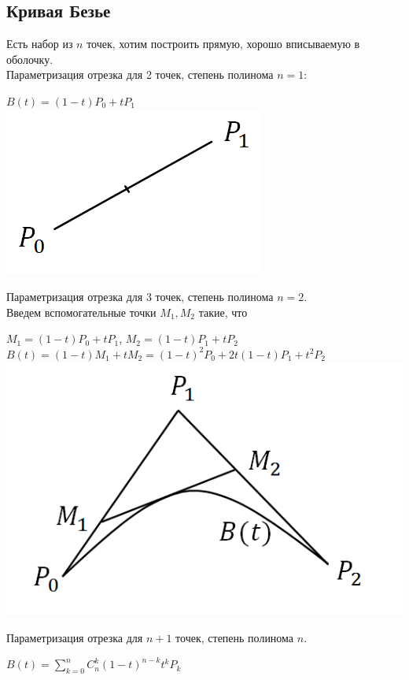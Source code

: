 \documentclass[12pt]{article}
\begin{document}
	\subsection{Кривая Безье}
	Есть набор из $n$ точек, хотим построить прямую, хорошо вписываемую в оболочку.\\
	Параметризация отрезка для 2 точек, степень полинома $n = 1$:
	\begin{center}
		$B(t) = (1-t)P_0+tP_1$\\
		\includegraphics[scale=0.5]{l3_7.png}\end{center}
	Параметризация отрезка для 3 точек, степень полинома $n = 2$.\\
	Введем вспомогательные точки $M_1, M_2$ такие, что \begin{center}$M_1 = (1-t)P_0+tP_1$, $M_2 = (1-t)P_1+tP_2$\\
		$B(t) = (1-t)M_1+tM_2 = (1-t)^2P_0+2t(1-t)P_1+t^2P_2$\\
		\includegraphics[scale=0.5]{l3_8.png}\end{center}
	Параметризация отрезка для $n+1$ точек, степень полинома $n$.
	\begin{center}$B(t) = \sum\limits_{k=0}^n C_n^k (1-t)^{n-k}t^kP_k$\end{center}
\end{document}
